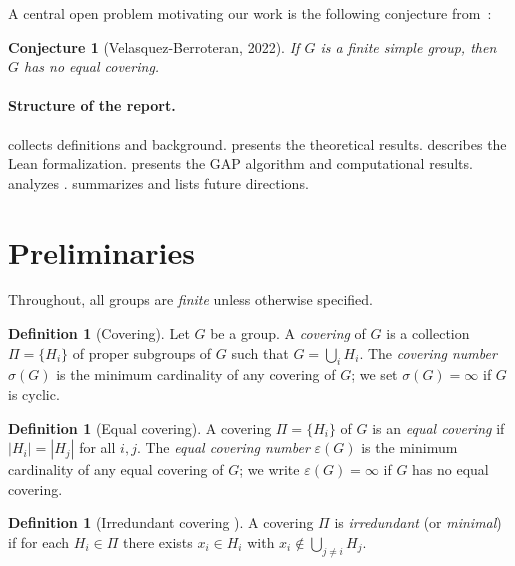 \documentclass[12pt, a4paper]{article}
\theoremstyle{plain}
\newtheorem{conjecture}[theorem]{Conjecture}
\theoremstyle{definition}
\newtheorem{definition}[theorem]{Definition}
\newcommand{\sig}{\sigma}
\newcommand{\eps}{\varepsilon}
\begin{document}
A central open problem motivating our work is the following conjecture from~\cite{velasquez2022}:

\begin{conjecture}[Velasquez-Berroteran, 2022]
  \label{conj:simple}
  If $G$ is a finite simple group, then $G$ has no equal covering.
\end{conjecture}

\paragraph{Structure of the report.}
 collects definitions and background.
 presents the theoretical results.
 describes the Lean formalization.
 presents the GAP algorithm and computational results.
 analyzes .
 summarizes and lists future directions.

\section{Preliminaries}
\label{sec:prelim}

Throughout, all groups are \emph{finite} unless otherwise specified.

\begin{definition}[Covering]
  Let $G$ be a group. A \emph{covering} of $G$ is a collection $\Pi = \{H_i\}$ of proper
  subgroups of $G$ such that $G = \bigcup_i H_i$. The \emph{covering number} $\sig(G)$ is
  the minimum cardinality of any covering of $G$; we set $\sig(G) = \infty$ if $G$ is cyclic.
\end{definition}

\begin{definition}[Equal covering]
  A covering $\Pi = \{H_i\}$ of $G$ is an \emph{equal covering} if $|H_i| = |H_j|$ for all
  $i, j$. The \emph{equal covering number} $\eps(G)$ is the minimum cardinality of any equal
  covering of $G$; we write $\eps(G) = \infty$ if $G$ has no equal covering.
\end{definition}

\begin{definition}[Irredundant covering {\cite[Definition~1]{velasquez2022}}]
  A covering $\Pi$ is \emph{irredundant} (or \emph{minimal}) if for each $H_i \in \Pi$
  there exists $x_i \in H_i$ with $x_i \notin \bigcup_{j \neq i} H_j$.
\end{definition}
\end{document}
